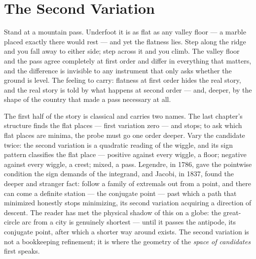\chapter{The Second Variation}

\begin{intuition}
Stand at a mountain pass. Underfoot it is as flat as any valley floor ---
a marble placed exactly there would rest --- and yet the flatness lies.
Step along the ridge and you fall away to either side; step across it and
you climb. The valley floor and the pass agree completely at first order
and differ in everything that matters, and the difference is invisible to
any instrument that only asks whether the ground is level. The feeling to
carry: flatness at first order hides the real story, and the real story
is told by what happens at second order --- and, deeper, by the shape of
the country that made a pass necessary at all.
\end{intuition}

The first half of the story is classical and carries two names. The last
chapter's structure finds the flat places --- first variation zero --- and
stops; to ask which flat places are minima, the probe must go one order
deeper. Vary the candidate twice: the second variation is a quadratic
reading of the wiggle, and its sign pattern classifies the flat place ---
positive against every wiggle, a floor; negative against every wiggle, a
crest; mixed, a pass. Legendre, in 1786, gave the pointwise condition the
sign demands of the integrand, and Jacobi, in 1837, found the deeper and
stranger fact: follow a family of extremals out from a point, and there
can come a definite station --- the conjugate point --- past which a path
that minimized honestly stops minimizing, its second variation acquiring
a direction of descent. The reader has met the physical shadow of this on
a globe: the great-circle arc from a city is genuinely shortest --- until
it passes the antipode, its conjugate point, after which a shorter way
around exists. The second variation is not a bookkeeping refinement; it
is where the geometry of the \emph{space of candidates} first speaks.

